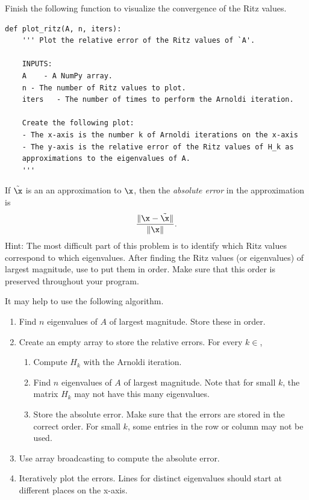 \begin{problem}
Finish the following function to visualize the convergence of the Ritz values.

\begin{lstlisting}
def plot_ritz(A, n, iters):
    ''' Plot the relative error of the Ritz values of `A'.

    INPUTS:
    A    - A NumPy array.
    n - The number of Ritz values to plot.
    iters   - The number of times to perform the Arnoldi iteration.

    Create the following plot:
    - The x-axis is the number k of Arnoldi iterations on the x-axis
    - The y-axis is the relative error of the Ritz values of H_k as
    approximations to the eigenvalues of A.
    '''
    \end{lstlisting}

If $\tilde{\x}$ is an an approximation to $\x$, then the \emph{absolute error} in the approximation is
\[
\frac{\|\x - \tilde{\x}\|}{\|\x\|}.
\]
Hint: The most difficult part of this problem is to identify which Ritz values correspond to which eigenvalues.
After finding the Ritz values (or eigenvalues) of largest magnitude, use  to put them in order.
Make sure that this order is preserved throughout your program.

It may help to use the following algorithm.
\begin{enumerate}
    \item Find $n$ eigenvalues of $A$ of largest magnitude. Store these in order.
    \item Create an empty array to store the relative errors. For every $k \in $\li{[1, iters)},
    \begin{enumerate}
        \item Compute $H_k$ with the Arnoldi iteration.
        \item Find $n$ eigenvalues of $A$ of largest magnitude. Note that for small $k$, the matrix $H_k$ may not have this many eigenvalues.
        \item Store the absolute error. Make sure that the errors are stored in the correct order. For small $k$, some entries in the row or column may not be used.
    \end{enumerate}
    \item Use array broadcasting to compute the absolute error.
    \item Iteratively plot the errors. Lines for distinct eigenvalues should start at different places on the x-axis.
\end{enumerate}


\end{problem}
